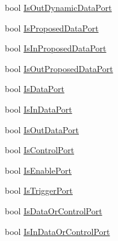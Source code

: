 \begin{DoxyCompactItemize}
bool \hyperlink{classi_c_s___editor_object_a3b57ef602801dd4ae3dc9898c3168598}{Is\+Out\+Dynamic\+Data\+Port}
\item 
bool \hyperlink{classi_c_s___editor_object_a027ddc46a3231b33f2252a661e544647}{Is\+Proposed\+Data\+Port}
\item 
bool \hyperlink{classi_c_s___editor_object_a395d6623a81eff85aa4ce84de36faace}{Is\+In\+Proposed\+Data\+Port}
\item 
bool \hyperlink{classi_c_s___editor_object_af44f59762d209400c4831c9d12f76597}{Is\+Out\+Proposed\+Data\+Port}
\item 
bool \hyperlink{classi_c_s___editor_object_a44498f6af0069c9ce102133de993aba0}{Is\+Data\+Port}
\item 
bool \hyperlink{classi_c_s___editor_object_a449ba0e08ecd400874af5e38237f3940}{Is\+In\+Data\+Port}
\item 
bool \hyperlink{classi_c_s___editor_object_a2d4ba645941bd214f07a9554846fe7e0}{Is\+Out\+Data\+Port}
\item 
bool \hyperlink{classi_c_s___editor_object_a2d4bf42734e84a367c71f8e59aabdbb5}{Is\+Control\+Port}
\item 
bool \hyperlink{classi_c_s___editor_object_a86229eae7b394ecec2f89891f8f3154e}{Is\+Enable\+Port}
\item 
bool \hyperlink{classi_c_s___editor_object_a6d236c37b043ecd5d8465c32beaecab2}{Is\+Trigger\+Port}
\item 
bool \hyperlink{classi_c_s___editor_object_a3f7fa3206d2227509aa98a9543ddb6fa}{Is\+Data\+Or\+Control\+Port}
\item 
bool \hyperlink{classi_c_s___editor_object_a2099c6826117fb68cec8593027dda4fa}{Is\+In\+Data\+Or\+Control\+Port}

\end{DoxyCompactItemize}
